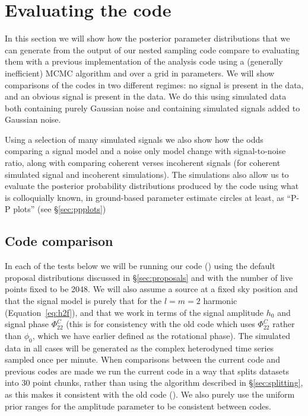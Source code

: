 \section{Evaluating the code}

In this section we will show how the posterior parameter distributions that we can generate from the output
of our nested sampling code compare to evaluating them with a previous implementation of the analysis code
\citep[\lppef, or for the rest of this document shortened to \lppe, used in, e.g.,][]{2014ApJ...785..119A} using a (generally inefficient) MCMC algorithm
and over a grid in parameters. We will show comparisons of the codes in two different regimes: no signal is present in the data, and an obvious signal is
present in the data. We do this using simulated data both containing purely Gaussian noise and containing simulated signals
added to Gaussian noise.

Using a selection of many simulated signals we also show how the odds comparing a signal model and a noise only model change with
signal-to-noise ratio, along with comparing coherent verses incoherent signals (for coherent simulated signal and incoherent simulations).
The simulations also allow us to evaluate the posterior probability distributions produced by the code using what is colloquially known,
in ground-based \gw parameter estimate circles at least, as ``P-P plots'' (see \S\ref{sec:ppplots})

\subsection{Code comparison}

In each of the tests below we will be running our code (\lppen) using the default proposal distributions discussed in \S\ref{sec:proposals}
and with the number of live points fixed to be 2048. We will also assume a source at a fixed sky position and that the signal model is purely
that for the $l=m=2$ harmonic (Equation~\ref{eq:h2f}), and that we work in terms of the signal amplitude $h_0$ and signal phase
$\Phi_{22}^C$ (this is for consistency with the old code which uses $\Phi_{22}^C$ rather than $\phi_0$, which we have earlier defined as the
rotational phase). The simulated data in all cases 
will be generated as the complex heterodyned
time series sampled once per minute. When comparisons between the current code and previous codes are 
made we run the current code in a way that splits datasets into 30 point chunks, rather than using the algorithm described in \S\ref{sec:splitting},
as this makes it consistent with the old code (\lppe). We also purely use the uniform prior ranges for the amplitude parameter to be
consistent between codes.

